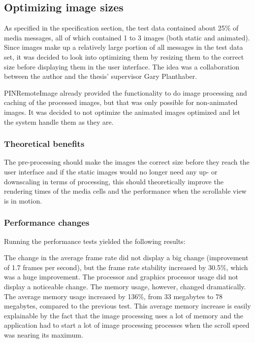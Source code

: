\documentclass[a4paper,12pt]{article}
\begin{document}
\subsection{Optimizing image sizes}
As specified in the specification section, the test data contained about 25\% of media messages, all of which contained 1 to 3 images (both static and animated). Since images make up a relatively large portion of all messages in the test data set, it was decided to look into optimizing them by resizing them to the correct size before displaying them in the user interface. The idea was a collaboration between the author and the thesis' supervisor Gary Planthaber.

PINRemoteImage already provided the functionality to do image processing and caching of the processed images, but that was only possible for non-animated images. It was decided to not optimize the animated images optimized and let the system handle them as they are.

\subsubsection*{Theoretical benefits}
The pre-processing should make the images the correct size before they reach the user interface and if the static images would no longer need any up- or downscaling in terms of processing, this should theoretically improve the rendering times of the media cells and the performance when the scrollable view is in motion.

\subsubsection*{Performance changes}
Running the performance tests yielded the following results:

The change in the average frame rate did not display a big change (improvement of 1.7 frames per second), but the frame rate stability increased by 30.5\%, which was a huge improvement. The processor and graphics processor usage did not display a noticeable change. The memory usage, however, changed dramatically. The average memory usage increased by 136\%, from 33 megabytes to 78 megabytes, compared to the previous test. This average memory increase is easily explainable by the fact that the image processing uses a lot of memory and the application had to start a lot of image processing processes when the scroll speed was nearing its maximum.
\end{document}
